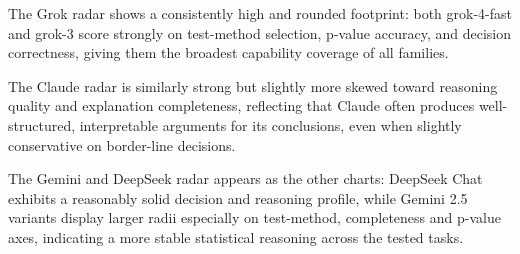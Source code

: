 \documentclass{article}
\begin{document}
The Grok radar shows a consistently high and rounded footprint: both grok-4-fast and grok-3 score strongly on test-method selection, p-value accuracy, and decision correctness, giving them the broadest capability coverage of all families. 

The Claude radar is similarly strong but slightly more skewed toward reasoning quality and explanation completeness, reflecting that Claude often produces well-structured, interpretable arguments for its conclusions, even when slightly conservative on border-line decisions. 

The Gemini and DeepSeek radar appears as the other charts: DeepSeek Chat exhibits a reasonably solid decision and reasoning profile, while Gemini 2.5 variants display larger radii especially on test-method, completeness and p-value axes, indicating a more stable statistical reasoning across the tested tasks.
\end{document}
